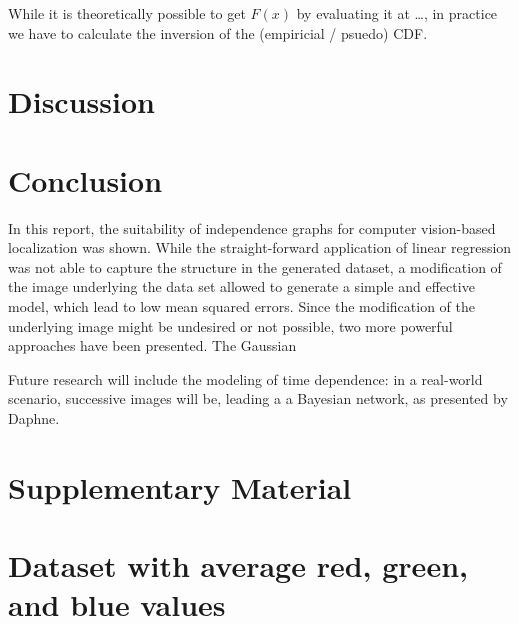 \documentclass{article}
\begin{document}
While it is theoretically possible to get $F(x)$ by evaluating it at
\ldots, in practice we have to calculate the inversion of the
(empiricial / psuedo) CDF.
                                          
\section{Discussion}



\section{Conclusion}

In this report, the suitability of independence graphs for computer
vision-based localization was shown. While the straight-forward
application of linear regression was not able to capture the structure
in the generated dataset, a modification of the image underlying the
data set allowed to generate a simple and effective model, which lead
to low mean squared errors. Since the
modification of the underlying image might be undesired or not
possible, two more powerful approaches have been presented. The
Gaussian 

Future research will include the modeling of time dependence: in a
real-world scenario, successive images will be, leading a a Bayesian
network, as presented by Daphne.



\appendix

\section{Supplementary Material}

\section{Dataset with average red, green, and blue values}
\begin{center}
\end{center}
\end{document}
